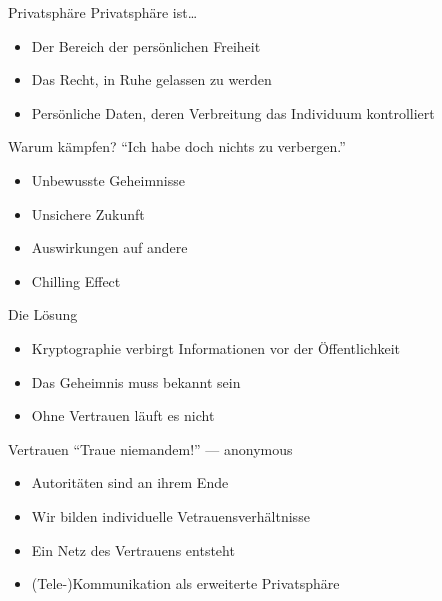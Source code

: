 \documentclass[aspectratio=1610]{beamer}
\begin{document}
  \begin{frame}{Privatsphäre}
    Privatsphäre ist…
    \begin{itemize}
      \pause
      \item Der Bereich der persönlichen Freiheit
      \pause
      \item Das Recht, in Ruhe gelassen zu werden
      \pause
      \item Persönliche Daten, deren Verbreitung das Individuum kontrolliert
    \end{itemize}
  \end{frame}

  \begin{frame}{Warum kämpfen?}
    “Ich habe doch nichts zu verbergen.”
    \begin{itemize}
      \item Unbewusste Geheimnisse
      \item Unsichere Zukunft
      \item Auswirkungen auf andere
      \item Chilling Effect
    \end{itemize}
  \end{frame}

  \begin{frame}{Die Lösung}
    \begin{itemize}
      \pause
      \item Kryptographie verbirgt Informationen vor der Öffentlichkeit
      \pause
      \item Das Geheimnis muss bekannt sein
      \pause
      \item Ohne Vertrauen läuft es nicht
    \end{itemize}
  \end{frame}

  \begin{frame}{Vertrauen}
    “Traue niemandem!” --- anonymous
    \begin{itemize}
      \pause
      \item Autoritäten sind an ihrem Ende
      \pause
      \item Wir bilden individuelle Vetrauensverhältnisse
      \pause
      \item Ein Netz des Vertrauens entsteht
      \pause
      \item (Tele-)Kommunikation als erweiterte Privatsphäre
    \end{itemize}
  \end{frame}
\end{document}
